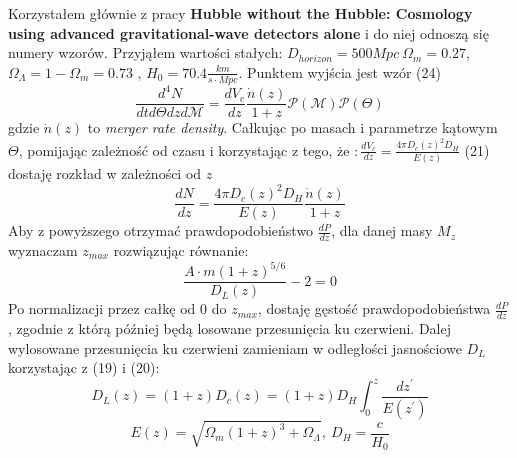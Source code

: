 \documentclass{minimal}
\begin{document}
Korzystałem głównie z pracy \textbf{Hubble without the Hubble:
Cosmology using advanced gravitational-wave detectors alone} i do niej odnoszą się numery wzorów.
Przyjąłem wartości stałych: $D_{horizon} = 500 Mpc\ \Omega_m = 0.27$, $\Omega_\Lambda = 1-\Omega_m =0.73$ , $H_0=70.4 \frac{km}{s\cdot Mpc}$.
\newline
Punktem wyjścia jest wzór (24)
\begin{equation*}
\frac{d^4N}{dt d\Theta dz d \mathcal{M}}=\frac{dV_c}{dz}\frac{\dot{n}(z)}{1+z} \mathcal{P}(\mathcal{M})\mathcal{P}(\Theta)
\end{equation*}
gdzie $\dot{n}(z)$ to \textit{merger rate density}. Całkując po masach i parametrze kątowym $\Theta$, pomijając zależność od czasu i korzystając z tego, że $:\frac{dV_c}{dz}= \frac{4\pi D_c(z)^2 D_H}{E(z)}$ (21) dostaję rozkład w zależności od $z$
\begin{equation*}
\frac{dN}{dz}=\frac{4\pi D_c(z)^2 D_H}{E(z)}\frac{\dot{n}(z)}{1+z} 
\end{equation*}
Aby z powyższego otrzymać prawdopodobieństwo $\frac{dP}{dz}$, dla danej masy $M_z$ wyznaczam $z_{max}$ rozwiązując równanie:
\begin{equation*}
\frac{A\cdot m(1+z)^{5/6}}{D_L(z)}-2=0
\end{equation*}
Po normalizacji przez całkę od $0$ do $z_{max}$, dostaję gęstość prawdopodobieństwa $\frac{dP}{dz}$, zgodnie z którą później będą losowane przesunięcia ku czerwieni. Dalej wylosowane przesunięcia ku czerwieni zamieniam w odległości jasnościowe $D_L$ korzystając z (19) i (20):
\begin{equation*}
D_L(z)=(1+z) D_c(z)=(1+z)D_H \int_{0}^{z}\dfrac{dz^\prime}{E(z^\prime)}
\end{equation*}
\begin{equation*}
E(z)=\sqrt{\Omega_m(1+z)^3+\Omega_\Lambda},\ D_H=\frac{c}{H_0}
\end{equation*}
\end{document}

